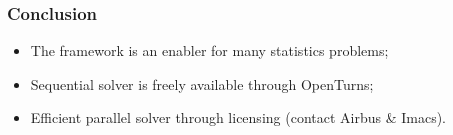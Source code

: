 \begin{frame}
\frametitle{Conclusion}
\begin{itemize}
  \item The \hmat framework is an enabler for many statistics problems;
  \item Sequential solver is freely available through OpenTurns;
  \item Efficient parallel solver through licensing (contact Airbus \& Imacs).
\end{itemize}
\end{frame}

